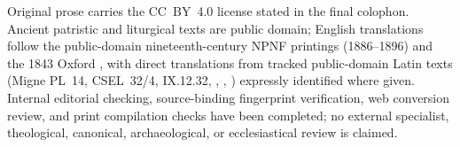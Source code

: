 Original prose carries the CC~BY~4.0 license stated in the final colophon. Ancient patristic and liturgical texts are public domain; English translations follow the public-domain nineteenth-century NPNF printings (1886--1896) and the 1843 Oxford , with direct translations from tracked public-domain Latin texts (Migne PL~14, CSEL~32/4,  IX.12.32, , , ) expressly identified where given. Internal editorial checking, source-binding fingerprint verification, web conversion review, and print compilation checks have been completed; no external specialist, theological, canonical, archaeological, or ecclesiastical review is claimed.
